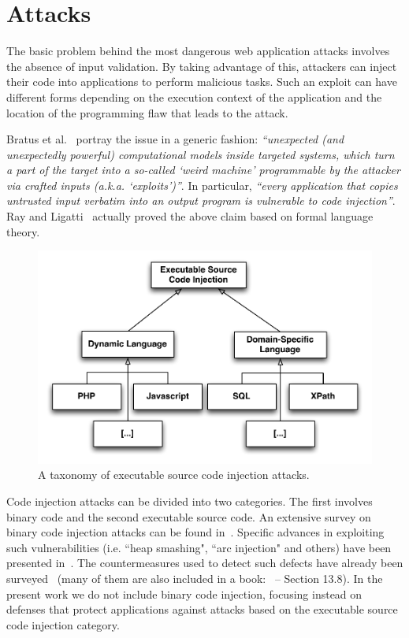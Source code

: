 \documentclass[conference]{IEEEtran}
\begin{document}
\section{Attacks}
\label{sec:attacks}

The basic problem behind the most dangerous
web application attacks involves
the absence of input validation. By taking advantage of
this, attackers can inject their code into
applications to perform malicious tasks. Such
an exploit can have different forms depending on the
execution context of the application and the location
of the programming flaw that leads to the attack.

Bratus et al.~\cite{BLSPS11} portray the issue in a generic fashion:
{\it ``unexpected (and unexpectedly powerful) computational models
  inside targeted systems, which turn a part of the target into a
  so-called `weird machine' programmable by the attacker via crafted
  inputs (a.k.a. `exploits')''}. In particular, {\it ``every
  application that copies untrusted input verbatim into an output
  program is vulnerable to code injection''}. Ray and
Ligatti~\cite{RL12b} actually proved the above claim based on formal
language theory.

\begin{figure}
\begin{center}
\leavevmode
\includegraphics[scale=0.47]{attack-tree-uml.pdf}
\end{center}
\caption{\label{fig:taxonomy}A taxonomy of executable source
code injection attacks.}
\end{figure}

Code injection attacks can be divided into two categories. The first
involves binary code and the second executable source code. An
extensive survey on binary code injection attacks can be found
in~\cite{LC03}. Specific advances in exploiting such vulnerabilities
(i.e. ``heap smashing", ``arc injection" and others) have been
presented in~\cite{PB04}. The countermeasures used to detect such
defects have already been surveyed~\cite{YJP12} (many of them are also
included in a book:~\cite{DKZ12} -- Section 13.8). In the present work
we do not include binary code injection, focusing instead on defenses
that protect applications against attacks based on the
executable source code injection category.
\end{document}
